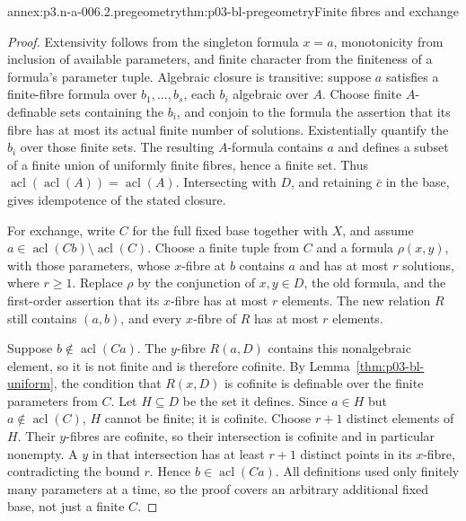 \begin{annexitem}{annex:p3.n-a-006.2.pregeometry}{thm:p03-bl-pregeometry}{Finite fibres and exchange}
\begin{proof}
Extensivity follows from the singleton formula \(x=a\), monotonicity
from inclusion of available parameters, and finite character from the
finiteness of a formula's parameter tuple. Algebraic closure is
transitive: suppose \(a\) satisfies a finite-fibre formula over
\(b_1,\ldots,b_s\), each \(b_i\) algebraic over \(A\). Choose finite
\(A\)-definable sets containing the \(b_i\), and conjoin to the formula
the assertion that its fibre has at most its actual finite number of
solutions. Existentially quantify the \(b_i\) over those finite sets.
The resulting \(A\)-formula contains \(a\) and defines a subset of a
finite union of uniformly finite fibres, hence a finite set. Thus
\(\operatorname{acl}(\operatorname{acl}(A))=\operatorname{acl}(A)\).
Intersecting with \(D\), and retaining \(\bar c\) in the base, gives
idempotence of the stated closure.

For exchange, write \(C\) for the full fixed base together with \(X\),
and assume \(a\in\operatorname{acl}(C b)\setminus\operatorname{acl}(C)\).
Choose a finite tuple from \(C\) and a formula \(\rho(x,y)\), with those
parameters, whose \(x\)-fibre at \(b\) contains \(a\) and has at most
\(r\) solutions, where \(r\geq1\). Replace \(\rho\) by the conjunction
of \(x,y\in D\), the old formula, and the first-order assertion that
its \(x\)-fibre has at most \(r\) elements. The new relation \(R\)
still contains \((a,b)\), and every \(x\)-fibre of \(R\) has at most
\(r\) elements.

Suppose \(b\notin\operatorname{acl}(C a)\). The \(y\)-fibre
\(R(a,D)\) contains this nonalgebraic element, so it is not finite and
is therefore cofinite. By Lemma~\ref{thm:p03-bl-uniform}, the condition
that \(R(x,D)\) is cofinite is definable over the finite parameters
from \(C\). Let \(H\subseteq D\) be the set it defines. Since
\(a\in H\) but \(a\notin\operatorname{acl}(C)\), \(H\) cannot be
finite; it is cofinite. Choose \(r+1\) distinct elements of \(H\).
Their \(y\)-fibres are cofinite, so their intersection is cofinite and
in particular nonempty. A \(y\) in that intersection has at least
\(r+1\) distinct points in its \(x\)-fibre, contradicting the
bound \(r\). Hence \(b\in\operatorname{acl}(C a)\). All definitions
used only finitely many parameters at a time, so the proof covers an
arbitrary additional fixed base, not just a finite \(C\).
\end{proof}
\end{annexitem}

